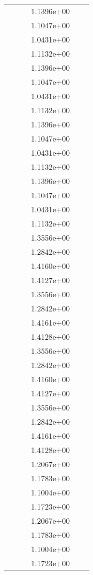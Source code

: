 \begin{xltabular}{\textwidth}{r|rS[table-format=1.3e+2]S[table-format=1.4e+2]S[table-format=1.4e+2]S[table-format=-1.5]}
&  &  & 1.1396e+00 & & \\
&  &  & 1.1047e+00 & & \\
&  &  & 1.0431e+00 & & \\
&  &  & 1.1132e+00 & & \\
&  &  & 1.1396e+00 & & \\
&  &  & 1.1047e+00 & & \\
&  &  & 1.0431e+00 & & \\
&  &  & 1.1132e+00 & & \\
&  &  & 1.1396e+00 & & \\
&  &  & 1.1047e+00 & & \\
&  &  & 1.0431e+00 & & \\
&  &  & 1.1132e+00 & & \\
&  &  & 1.1396e+00 & & \\
&  &  & 1.1047e+00 & & \\
&  &  & 1.0431e+00 & & \\
&  &  & 1.1132e+00 & & \\
&  &  & 1.3556e+00 & & \\
&  &  & 1.2842e+00 & & \\
&  &  & 1.4160e+00 & & \\
&  &  & 1.4127e+00 & & \\
&  &  & 1.3556e+00 & & \\
&  &  & 1.2842e+00 & & \\
&  &  & 1.4161e+00 & & \\
&  &  & 1.4128e+00 & & \\
&  &  & 1.3556e+00 & & \\
&  &  & 1.2842e+00 & & \\
&  &  & 1.4160e+00 & & \\
&  &  & 1.4127e+00 & & \\
&  &  & 1.3556e+00 & & \\
&  &  & 1.2842e+00 & & \\
&  &  & 1.4161e+00 & & \\
&  &  & 1.4128e+00 & & \\
&  &  & 1.2067e+00 & & \\
&  &  & 1.1783e+00 & & \\
&  &  & 1.1004e+00 & & \\
&  &  & 1.1723e+00 & & \\
&  &  & 1.2067e+00 & & \\
&  &  & 1.1783e+00 & & \\
&  &  & 1.1004e+00 & & \\
&  &  & 1.1723e+00 & & \\

\end{xltabular}
